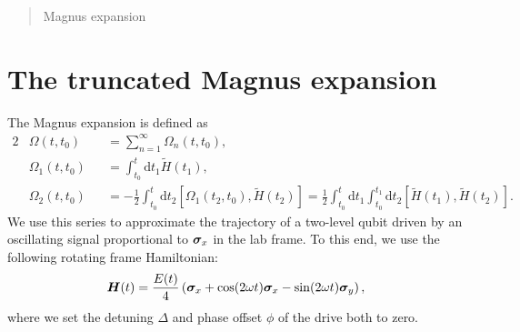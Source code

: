 \maketitle %
\thispagestyle{firststyle} %


\vspace{1em}
\begin{abstract}
\noindent  
Magnus expansion
	
\end{abstract}
\newpage

\tableofcontents





\newpage
\section{The truncated Magnus expansion}
The Magnus expansion\supercite{Magnusexponentialsolutiondifferential1954,WaughAverageHamiltonianTheory2007,BlanesMagnusexpansionits2009,BlanespedagogicalapproachMagnus2010} is defined as
\begin{alignat}{2}
	&\Omega(t,t_0) &&= \sum_{n=1}^\infty \Omega_n(t,t_0),\\
	&\Omega_1(t,t_0) &&= \int_{t_0}^t \mathrm{d}t_1 \tilde{H}(t_1),\label{eq:omg-1}\\
	&\Omega_2(t,t_0) &&= -\frac{1}{2}\int_{t_0}^t \mathrm{d}t_2 \left[ \Omega_1(t_2,t_0), \tilde{H}(t_2) \right] = \frac{1}{2}\int_{t_0}^t \mathrm{d}t_1 \int_{t_0}^{t_1} \mathrm{d}t_2 \left[ \tilde{H}(t_1), \tilde{H}(t_2) \right].
\end{alignat}
We use this series to approximate the trajectory of a two-level qubit driven by an oscillating signal proportional to $\bm{\sigma}_x$ in the lab frame. To this end, we use the following rotating frame Hamiltonian:
\begin{align}
	\label{eq:H-drive}
	\bm{H}(t) = \frac{E(t)}{4}\left( \bm{\sigma}_x + \cos(2 \omega t) \bm{\sigma}_x - \sin(2 \omega t) \bm{\sigma}_y \right),
\end{align}
where we set the detuning $\Delta$ and phase offset $\phi$ of the drive both to zero.

